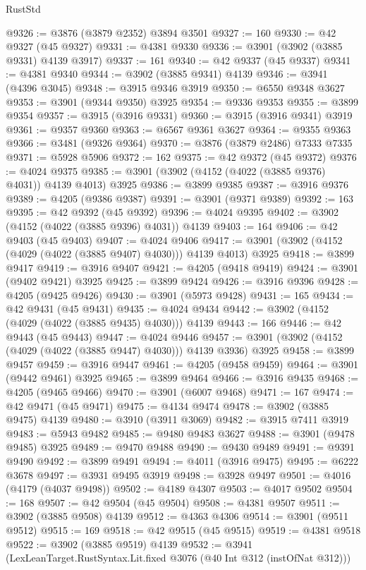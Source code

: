 \begin{lexlean}{RustStd}
\begin{coremodule}
@9326 := @3876 (@3879 @2352) @3894 @3501
@9327 := 160
@9330 := @42 @9327 (@45 @9327)
@9331 := @4381 @9330
@9336 := @3901 (@3902 (@3885 @9331) @4139 @3917)
@9337 := 161
@9340 := @42 @9337 (@45 @9337)
@9341 := @4381 @9340
@9344 := @3902 (@3885 @9341) @4139
@9346 := @3941 (@4396 @3045)
@9348 := @3915 @9346 @3919
@9350 := @6550 @9348 @3627
@9353 := @3901 (@9344 @9350) @3925
@9354 := @9336 @9353
@9355 := @3899 @9354
@9357 := @3915 (@3916 @9331)
@9360 := @3915 (@3916 @9341) @3919
@9361 := @9357 @9360
@9363 := @6567 @9361 @3627
@9364 := @9355 @9363
@9366 := @3481 (@9326 @9364)
@9370 := @3876 (@3879 @2486) @7333 @7335
@9371 := @5928 @5906
@9372 := 162
@9375 := @42 @9372 (@45 @9372)
@9376 := @4024 @9375
@9385 := @3901 (@3902 (@4152 (@4022 (@3885 @9376) @4031)) @4139 @4013) @3925
@9386 := @3899 @9385
@9387 := @3916 @9376
@9389 := @4205 (@9386 @9387)
@9391 := @3901 (@9371 @9389)
@9392 := 163
@9395 := @42 @9392 (@45 @9392)
@9396 := @4024 @9395
@9402 := @3902 (@4152 (@4022 (@3885 @9396) @4031)) @4139
@9403 := 164
@9406 := @42 @9403 (@45 @9403)
@9407 := @4024 @9406
@9417 := @3901 (@3902 (@4152 (@4029 (@4022 (@3885 @9407) @4030))) @4139 @4013) @3925
@9418 := @3899 @9417
@9419 := @3916 @9407
@9421 := @4205 (@9418 @9419)
@9424 := @3901 (@9402 @9421) @3925
@9425 := @3899 @9424
@9426 := @3916 @9396
@9428 := @4205 (@9425 @9426)
@9430 := @3901 (@5973 @9428)
@9431 := 165
@9434 := @42 @9431 (@45 @9431)
@9435 := @4024 @9434
@9442 := @3902 (@4152 (@4029 (@4022 (@3885 @9435) @4030))) @4139
@9443 := 166
@9446 := @42 @9443 (@45 @9443)
@9447 := @4024 @9446
@9457 := @3901 (@3902 (@4152 (@4029 (@4022 (@3885 @9447) @4030))) @4139 @3936) @3925
@9458 := @3899 @9457
@9459 := @3916 @9447
@9461 := @4205 (@9458 @9459)
@9464 := @3901 (@9442 @9461) @3925
@9465 := @3899 @9464
@9466 := @3916 @9435
@9468 := @4205 (@9465 @9466)
@9470 := @3901 (@6007 @9468)
@9471 := 167
@9474 := @42 @9471 (@45 @9471)
@9475 := @4134 @9474
@9478 := @3902 (@3885 @9475) @4139
@9480 := @3910 (@3911 @3069)
@9482 := @3915 @7411 @3919
@9483 := @5943 @9482
@9485 := @9480 @9483 @3627
@9488 := @3901 (@9478 @9485) @3925
@9489 := @9470 @9488
@9490 := @9430 @9489
@9491 := @9391 @9490
@9492 := @3899 @9491
@9494 := @4011 (@3916 @9475)
@9495 := @6222 @3678
@9497 := @3931 @9495 @3919
@9498 := @3928 @9497
@9501 := @4016 (@4179 (@4037 @9498))
@9502 := @4189 @4307
@9503 := @4017 @9502
@9504 := 168
@9507 := @42 @9504 (@45 @9504)
@9508 := @4381 @9507
@9511 := @3902 (@3885 @9508) @4139
@9512 := @4363 @4306
@9514 := @3901 (@9511 @9512)
@9515 := 169
@9518 := @42 @9515 (@45 @9515)
@9519 := @4381 @9518
@9522 := @3902 (@3885 @9519) @4139
@9532 := @3941 (LexLeanTarget.RustSyntax.Lit.fixed @3076 (@40 Int @312 (instOfNat @312)))

\end{coremodule}
\end{lexlean}
